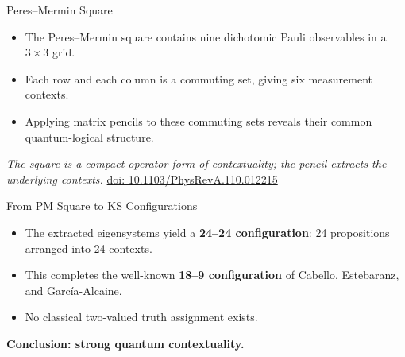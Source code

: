\documentclass[xcolor=dvipsnames]{beamer}
\newenvironment{slideitems}{%
  \begin{itemize}\setlength{\itemsep}{0.55em}\setlength{\parskip}{0pt}%
}{\end{itemize}}
\begin{document}
\begin{frame}{Peres--Mermin Square}
\begin{slideitems}
  \item The Peres--Mermin square contains nine dichotomic Pauli observables in a
        $3\times3$ grid.
  \item Each row and each column is a commuting set, giving six measurement
        contexts.
  \item Applying matrix pencils to these commuting sets reveals their common
        quantum-logical structure.
\end{slideitems}

\vspace{4mm}
\centering
\textit{The square is a compact operator form of contextuality; the pencil
extracts the underlying contexts.}
\centering
\href{https://doi.org/10.1103/PhysRevA.110.012215}{doi: 10.1103/PhysRevA.110.012215}
\end{frame}

\begin{frame}{From PM Square to KS Configurations}
\begin{slideitems}
  \item The extracted eigensystems yield a \textbf{24--24 configuration}:
        24 propositions arranged into 24 contexts.
  \item This completes the well-known \textbf{18--9 configuration} of Cabello,
        Estebaranz, and Garc\'{i}a-Alcaine.
  \item No classical two-valued truth assignment exists.
\end{slideitems}

\vspace{4mm}
\centering
\Large
\textbf{Conclusion: strong quantum contextuality.}
\end{frame}
\end{document}
